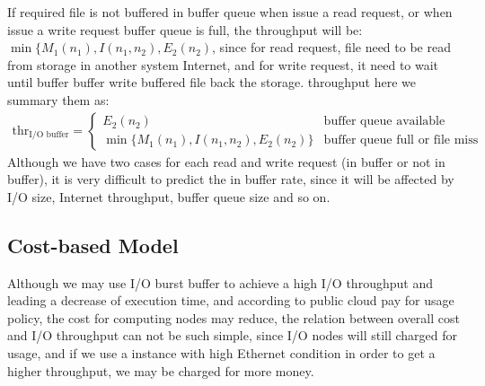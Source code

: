 If required file is not buffered in buffer queue when issue a read request, or when issue a write request buffer queue is full, the throughput will be:$\min\{M_1(n_1),I(n_1,n_2),E_2(n_2)$, since for read request, file need to be read from storage in another system Internet, and for write request, it need to wait until buffer buffer write buffered file back the storage.
throughput  here we summary them as:
\begin{eqnarray}
	\text{thr}_{\text{I/O buffer}}=\begin{cases}
		E_2(n_2) &\text{buffer queue available}\\ 
	\min\{M_1(n_1),I(n_1,n_2),E_2(n_2)\} &\text{buffer queue full or file miss}
	\end{cases} \label{throughput2}
\end{eqnarray}
Although we have two cases for each read and write request (in buffer or not in buffer), it is very difficult to predict the in buffer rate, since it will be affected by I/O size, Internet throughput, buffer queue size and so on.


\subsection{Cost-based Model}
Although we may use I/O burst buffer to achieve a high I/O throughput and leading a decrease of execution time, and according to public cloud pay for usage policy, the cost for computing nodes may reduce, the relation between overall cost and I/O throughput can not be such simple, since I/O nodes will still charged for usage, and if we use a instance with high Ethernet condition in order to get a higher throughput, we may be charged for more money.

